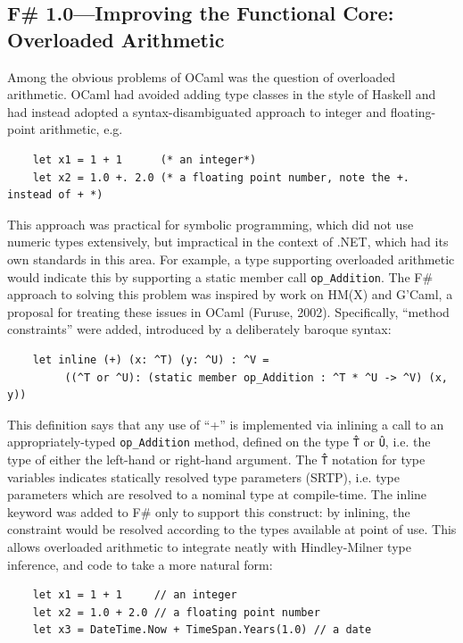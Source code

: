 \documentclass[acmsmall]{acmart}\settopmatter{}
\begin{document}
\subsection*{F\# 1.0---Improving the Functional Core: Overloaded Arithmetic }

Among the obvious problems of OCaml was the question of overloaded arithmetic.  OCaml had avoided adding type classes in the style of Haskell and had instead adopted a syntax-disambiguated approach to integer and floating-point arithmetic, e.g.

\begin{verbatim}
    let x1 = 1 + 1      (* an integer*)
    let x2 = 1.0 +. 2.0 (* a floating point number, note the +. instead of + *)
\end{verbatim}

This approach was practical for symbolic programming, which did not use numeric types extensively, but impractical in the context of .NET, which had its own standards in this area. For example, a type supporting overloaded arithmetic would indicate this by supporting a static member call \texttt{op\_Addition}. The F\# approach to solving this problem was inspired by work on HM(X) and G'Caml, a proposal for treating these issues in OCaml (Furuse, 2002).  Specifically, “method constraints” were added, introduced by a deliberately baroque syntax:

\begin{verbatim}
    let inline (+) (x: ^T) (y: ^U) : ^V = 
         ((^T or ^U): (static member op_Addition : ^T * ^U -> ^V) (x, y))
\end{verbatim}

This definition says that any use of “+” is implemented via inlining a call to an appropriately-typed \texttt{op\_Addition} method, defined on the type \texttt{\^T} or \texttt{\^U}, i.e. the type of either the left-hand or right-hand argument.  The \texttt{\^T} notation for type variables indicates statically resolved type parameters (SRTP), i.e. type parameters which are resolved to a nominal type at compile-time.  The inline keyword was added to F\# only to support this construct: by inlining, the constraint would be resolved according to the types available at point of use. This allows overloaded arithmetic to integrate neatly with Hindley-Milner type inference, and code to take a more natural form:

\begin{verbatim}
    let x1 = 1 + 1     // an integer
    let x2 = 1.0 + 2.0 // a floating point number
    let x3 = DateTime.Now + TimeSpan.Years(1.0) // a date
\end{verbatim}
\end{document}
